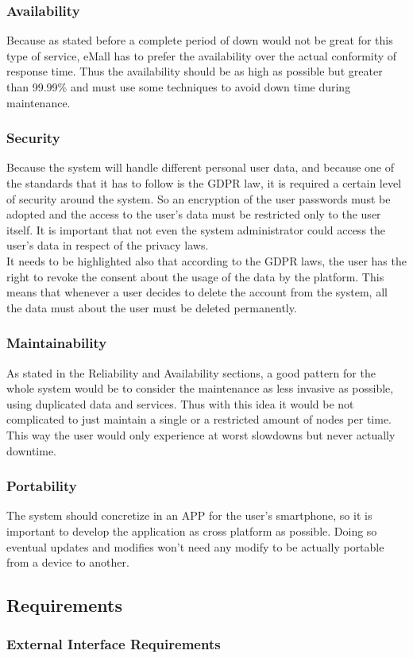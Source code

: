 \subsubsection{Availability}
Because as stated before a complete period of down would not be great for this type of service, eMall has to prefer the availability over the actual conformity of response time.
Thus the availability should be as high as possible but greater than 99.99\% and must use some techniques to avoid down time during maintenance.
\subsubsection{Security}
Because the system will handle different personal user data, and because one of the standards that it has to follow is the \ac{GDPR} law, it is required a certain level
of security around the system. So an encryption of the user passwords must be adopted and the access to the user's data must be restricted only to the user itself.
It is important that not even the system administrator could access the user's data in respect of the privacy laws.\\
It needs to be highlighted also that according to the \ac{GDPR} laws, the user has the right to revoke the consent about the usage of the data by the platform. This means that
whenever a user decides to delete the account from the system, all the data must about the user must be deleted permanently.
\subsubsection{Maintainability}
As stated in the Reliability and Availability sections, a good pattern for the whole system would be to consider the maintenance as less invasive as possible, using duplicated data and services.
Thus with this idea it would be not complicated to just maintain a single or a restricted amount of nodes per time. This way the user would only experience at worst slowdowns but never actually downtime.
\subsubsection{Portability}
The system should concretize in an APP for the user's smartphone, so it is important to develop the application as cross platform as possible. Doing so eventual updates and modifies won't need any modify to be actually portable from a device to another.
\subsection{Requirements}
\subsubsection{External Interface Requirements}
\clearpage